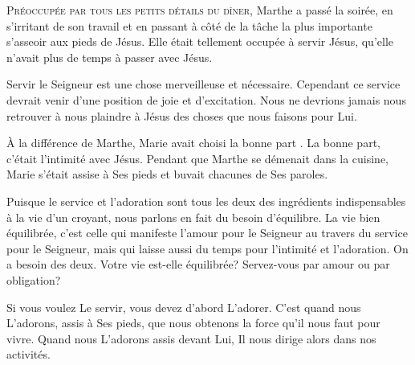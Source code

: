 


\lettrine{P}{réoccupée par tous les petits détails du dîner,}
 Marthe a passé la soirée, en s'irritant de son travail et en passant
 à côté de la tâche la plus importante \ocadr s'asseoir aux pieds de Jésus.
 Elle était tellement occupée à servir Jésus,
 qu'elle n'avait plus de temps à passer avec Jésus.

Servir le Seigneur est une chose merveilleuse et nécessaire.
 Cependant ce service devrait venir d'une position de joie et d'excitation.
 Nous ne devrions jamais nous retrouver à nous plaindre à Jésus
 des choses que nous faisons pour Lui.


À la différence de Marthe, Marie avait choisi \og la bonne part \fg{}.
 La bonne part, c'était l'intimité avec Jésus.
 Pendant que Marthe se démenait dans la cuisine,
 Marie s'était assise à Ses pieds et buvait chacunes de Ses paroles.

Puisque le service et l'adoration sont tous les deux des ingrédients
 indispensables à la vie d'un croyant, nous parlons en fait
 du besoin d'équilibre. La vie bien équilibrée, c'est celle qui manifeste
 l'amour pour le Seigneur au travers du service pour le Seigneur,
 mais qui laisse aussi du temps pour l'intimité et l'adoration.
 On a besoin des deux. Votre vie est-elle équilibrée?
 Servez-vous par amour ou par obligation?

Si vous voulez Le servir, vous devez d'abord L'adorer.
 C'est quand nous L'adorons, assis à Ses pieds, que nous obtenons
 la force qu'il nous faut pour vivre.
 Quand nous L'adorons assis devant Lui,
 Il nous dirige alors dans nos activités.

\dvrule




